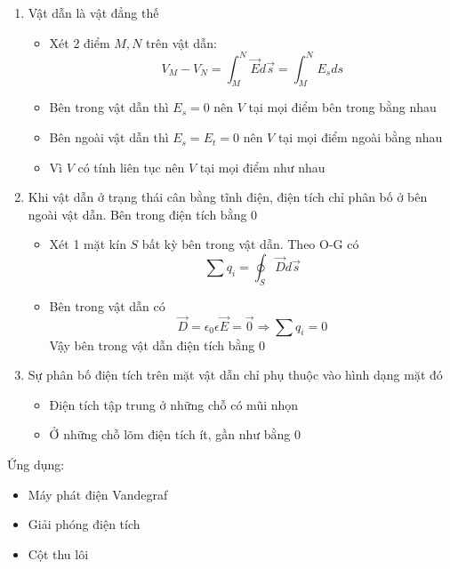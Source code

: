 \begin{enumerate}
  \item Vật dẫn là vật đẳng thế
  \begin{itemize}
    \item Xét 2 điểm $M, N$ trên vật dẫn:
    \begin{equation*}
      V_M - V_N = \int_{M}^{N} \vec{E}d\vec{s} = \int_{M}^{N} E_sds
    \end{equation*}
    \item Bên trong vật dẫn thì $E_s = 0$ nên $V$ tại mọi điểm bên trong bằng nhau
    \item Bên ngoài vật dẫn thì $E_s = E_t = 0$ nên $V$ tại mọi điểm ngoài bằng nhau
    \item Vì $V$ có tính liên tục nên $V$ tại mọi điểm như nhau
  \end{itemize}
  \item Khi vật dẫn ở trạng thái cân bằng tĩnh điện, điện tích chỉ phân bố ở bên ngoài vật dẫn. Bên trong điện tích bằng 0
  \begin{itemize}
    \item Xét 1 mặt kín $S$ bất kỳ bên trong vật dẫn. Theo O-G có
    \begin{equation*}
      \sum q_i = \oint_S \vec{D}d\vec{s}
    \end{equation*}
    \item Bên trong vật dẫn có 
    \begin{equation*}
      \vec{D} = \epsilon_0\epsilon\vec{E} = \vec{0} \Rightarrow \sum q_i = 0
    \end{equation*}
    Vậy bên trong vật dẫn điện tích bằng 0
  \end{itemize}
  \item Sự phân bố điện tích trên mặt vật dẫn chỉ phụ thuộc vào hình dạng mặt đó
  \begin{itemize}
    \item Điện tích tập trung ở những chỗ có mũi nhọn
    \item Ở những chỗ lõm điện tích ít, gần như bằng 0
  \end{itemize}
\end{enumerate}

Ứng dụng:

\begin{itemize}
  \item Máy phát điện Vandegraf
  \item Giải phóng điện tích
  \item Cột thu lôi
\end{itemize}

